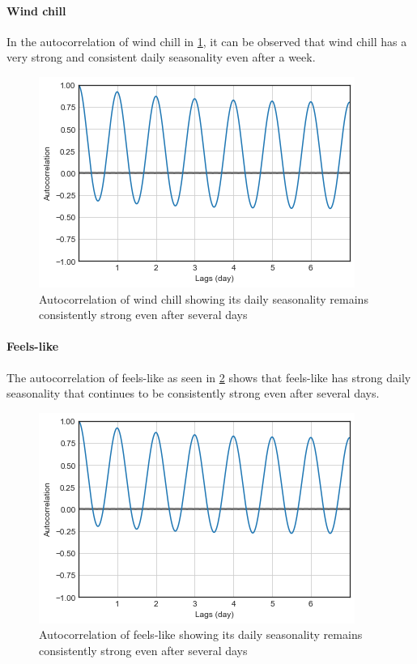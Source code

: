 \paragraph{Wind chill}

In the autocorrelation of wind chill in \ref{figure_autocorr_windchill}, it can be observed that wind chill has a very strong and consistent daily seasonality even after a week.  


\begin{figure}
  \includegraphics[width=\linewidth]
  {figures/figure_autocorr_windchill.png}
  \caption{ Autocorrelation of wind chill showing its daily seasonality remains consistently strong even after several days}
  \label{figure_autocorr_windchill}
\end{figure}

\paragraph{Feels-like}

The autocorrelation of feels-like as seen in \ref{figure_autocorr_feelslike} shows that feels-like has strong daily seasonality that continues to be consistently strong even after several days.  


\begin{figure}
  \includegraphics[width=\linewidth]
  {figures/figure_autocorr_feelslike.png}
  \caption{ Autocorrelation of feels-like showing its daily seasonality remains consistently strong even after several days}
  \label{figure_autocorr_feelslike}
\end{figure}


